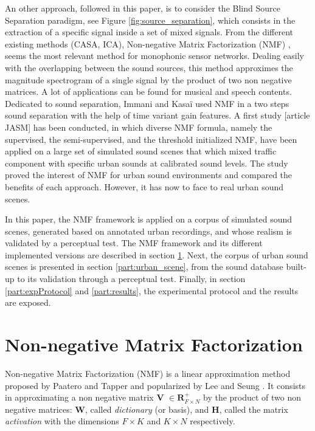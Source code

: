 \documentclass[review,5p,twocolumn,sort&compress,times]{elsarticle}
\begin{document}
An other approach, followed in this paper, is to consider the Blind Source Separation paradigm, see Figure \ref{fig:source_separation}, which consists in the extraction of a specific signal inside a set of mixed signals. From the different existing methods (CASA, ICA), Non-negative Matrix Factorization (NMF) \cite{lee_learning_1999}, seems the most relevant method for monophonic sensor networks. Dealing easily with the overlapping between the sound sources, this method approximes the magnitude spectrogram of a single signal by the product of two non negative matrices. A lot of applications can be found for musical \cite{smaragdis_non-negative_2003, benetos2006musical} and speech \cite{wilson_speech_2008, mysore2011non} contents. Dedicated to sound separation, Immani and Kasa\"i \cite{satoshi_innami_nmf-based_2012} used NMF in a two steps sound separation with the help of time variant gain features. A first study [article JASM] has been conducted, in which diverse NMF formula, namely the supervised, the semi-supervised, and the threshold initialized NMF, have been applied on a large set of simulated sound scenes that which mixed traffic component with specific urban sounds at calibrated sound levels. The study proved the interest of NMF for urban sound environments and compared the benefits of each approach. However, it has now to face to real urban sound scenes.

In this paper, the NMF framework is applied on a corpus of simulated sound scenes, generated based on annotated urban recordings, and whose realism is validated by a perceptual test. The NMF framework and its different implemented versions are described in section \ref{part:nmf}. Next, the corpus of urban sound scenes is presented in section \ref{part:urban_scene}, from the sound database built-up to its validation through a perceptual test. Finally, in section \ref{part:expProtocol} and \ref{part:results}, the experimental protocol and the results are exposed.

\section{Non-negative Matrix Factorization}\label{part:nmf}

Non-negative Matrix Factorization (NMF) is a linear approximation method proposed by Paatero and Tapper \cite{paatero1994positive} and popularized by Lee and Seung \cite{lee_learning_1999}. It consists in approximating a non negative matrix $\mathbf{V}$ $\in \mathbf{R}^+_{F \times N}$ by the product of two non negative matrices: $\mathbf{W}$, called \textit{dictionary} (or basis), and $\mathbf{H}$, called the matrix \textit{activation} with the dimensions $F \times K$ and $K \times N$ respectively. 
\end{document}
